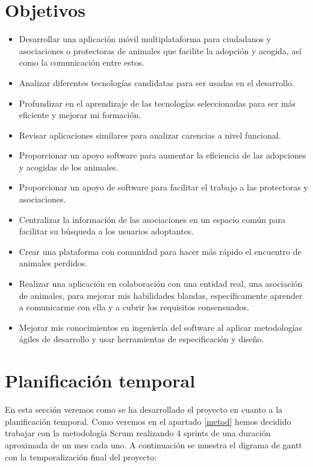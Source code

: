 \section{Objetivos} \label{objetivos}

\begin{itemize}
	\item Desarrollar una aplicación móvil multiplataforma para ciudadanos y asociaciones o protectoras de animales que facilite la adopción y acogida, así como la comunicación entre estos. %
	\item Analizar diferentes tecnologías candidatas para ser usadas en el desarrollo.
	\item Profundizar en el aprendizaje de las tecnologías seleccionadas para ser más eficiente y mejorar mi formación.
	\item Revisar aplicaciones similares para analizar carencias a nivel funcional. %
	\item Proporcionar un apoyo software para aumentar la eficiencia de las adopciones y acogidas de los animales. %
	\item Proporcionar un apoyo de software para facilitar el trabajo a las protectoras y asociaciones.
	\item Centralizar la información de las asociaciones en un espacio común para facilitar su búsqueda a los usuarios adoptantes.
	\item Crear una plataforma con comunidad para hacer más rápido el encuentro de animales perdidos.
	\item Realizar una aplicación en colaboración con una entidad real, una asociación de animales, para mejorar mis habilidades blandas, específicamente aprender a comunicarme con ella y a cubrir los requisitos consensuados.
	\item Mejorar mis conocimientos en ingeniería del software al aplicar metodologías ágiles de desarrollo y usar herramientas de especificación y diseño.
	
\end{itemize}

\section{Planificación temporal}
En esta sección veremos como se ha desarrollado el proyecto en cuanto a la planificación temporal. Como veremos en el apartado \ref{metod} hemos decidido trabajar con la metodología Scrum realizando 4 sprints de una duración aproximada de un mes cada uno. A continuación se muestra el digrama de gantt con la temporalización final del proyecto:

